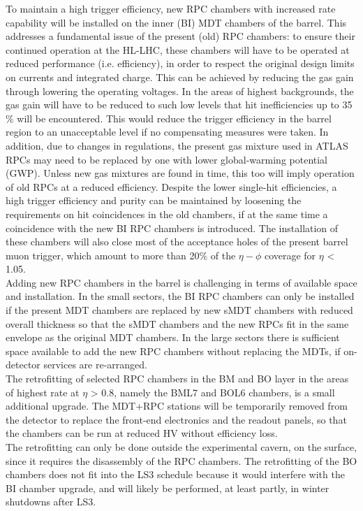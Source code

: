 \noindent To maintain a high trigger efficiency, new RPC chambers with increased rate capability will be installed on the inner (BI) MDT chambers of the barrel. This addresses a fundamental issue
of the present (old) RPC chambers: to ensure their continued operation at the HL-LHC,
these chambers will have to be operated at reduced performance (i.e. efficiency), in order to
respect the original design limits on currents and integrated charge. This can be achieved
by reducing the gas gain through lowering the operating voltages. In the areas of highest
backgrounds, the gas gain will have to be reduced to such low levels that hit inefficiencies
up to 35$\%$ will be encountered. This would reduce the trigger efficiency in the barrel region
to an unacceptable level if no compensating measures were taken. In addition, due
to changes in regulations, the present gas mixture used in ATLAS RPCs may need to be
replaced by one with lower global-warming potential (GWP). Unless new gas mixtures are
found in time, this too will imply operation of old RPCs at a reduced efficiency. Despite
the lower single-hit efficiencies, a high trigger efficiency and purity can be maintained by
loosening the requirements on hit coincidences in the old chambers, if at the same time a
coincidence with the new BI RPC chambers is introduced. The installation of these chambers
will also close most of the acceptance holes of the present barrel muon trigger, which
amount to more than 20$\%$ of the $\eta-\phi$ coverage for $\eta$ < 1.05.\\

\noindent Adding new RPC chambers in the barrel is challenging in terms of available space and
installation. In the small sectors, the BI RPC chambers can only be installed if the present
MDT chambers are replaced by new sMDT chambers with reduced overall thickness so that
the sMDT chambers and the new RPCs fit in the same envelope as the original MDT chambers.
In the large sectors there is sufficient space available to add the new RPC chambers
without replacing the MDTs, if on-detector services are re-arranged.\\
The retrofitting of selected RPC chambers in the BM and BO layer in the areas of highest
rate at $\eta$ > 0.8, namely the BML7 and BOL6 chambers, is a small additional upgrade. The
MDT+RPC stations will be temporarily removed from the detector to replace the front-end
electronics and the readout panels, so that the chambers can be run at reduced HV without
efficiency loss. \\
The retrofitting can only be done outside the experimental cavern, on the
surface, since it requires the disassembly of the RPC chambers. The retrofitting of the BO
chambers does not fit into the LS3 schedule because it would interfere with the BI chamber
upgrade, and will likely be performed, at least partly, in winter shutdowns after LS3.\\


